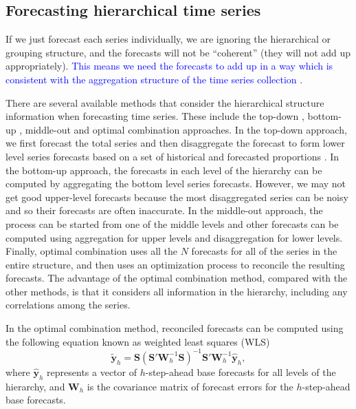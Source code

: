 \documentclass[11pt,a4paper,]{article}
\begin{document}
\hypertarget{forecasting-hierarchical-time-series}{%
\subsection{Forecasting hierarchical time series}\label{forecasting-hierarchical-time-series}}

If we just forecast each series individually, we are ignoring the hierarchical or grouping structure, and the forecasts will not be ``coherent'' (they will not add up appropriately). \textcolor{blue}{This means we need the forecasts to add up in a way which is consistent with the aggregation structure of the time series collection} \autocite{fpp2}.

There are several available methods that consider the hierarchical structure information when forecasting time series. These include the top-down \autocite{gross1990disaggregation,fliedner2001hierarchical}, bottom-up \autocite{kahn1998revisiting}, middle-out and optimal combination \autocite{hyndman2011optimal} approaches. In the top-down approach, we first forecast the total series and then disaggregate the forecast to form lower level series forecasts based on a set of historical and forecasted proportions \autocite[for details see][]{athanasopoulos2009hierarchical}. In the bottom-up approach, the forecasts in each level of the hierarchy can be computed by aggregating the bottom level series forecasts. However, we may not get good upper-level forecasts because the most disaggregated series can be noisy and so their forecasts are often inaccurate. In the middle-out approach, the process can be started from one of the middle levels and other forecasts can be computed using aggregation for upper levels and disaggregation for lower levels. Finally, optimal combination uses all the \(N\) forecasts for all of the series in the entire structure, and then uses an optimization process to reconcile the resulting forecasts. The advantage of the optimal combination method, compared with the other methods, is that it considers all information in the hierarchy, including any correlations among the series.

In the optimal combination method, reconciled forecasts can be computed using the following equation known as weighted least squares (WLS) \autocite{mint2018}
\begin{equation}\label{eq:mint}
  \tilde{\bm{y}}_{h}=\bm{S}(\bm{S}'\bm{W}_h^{-1}\bm{S})^{-1}\bm{S}'\bm{W}_h^{-1}\hat{\bm{y}}_h,
\end{equation}
where \(\hat{\bm{y}}_h\) represents a vector of \(h\)-step-ahead base forecasts for all levels of the hierarchy, and \(\bm{W}_h\) is the covariance matrix of forecast errors for the \(h\)-step-ahead base forecasts.
\end{document}
